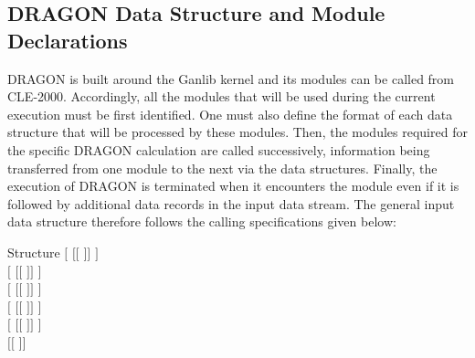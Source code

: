 \subsection{DRAGON Data Structure and Module Declarations}\label{sect:StrucMod}

DRAGON is built around the Ganlib kernel and its modules can be called from CLE-2000.\cite{ganlib5,cle2000}
Accordingly, all the modules that will be used during the current execution must
be first identified. One must also define the format of each data structure that
will be processed by these modules. Then, the modules required for the specific
DRAGON calculation are called successively, information being
transferred from one module to the next via the data structures. Finally,
the execution of DRAGON is terminated when it encounters the  module
even if it is followed by additional data records in the input data stream. The
general input data structure therefore follows the calling specifications given
below:

\begin{DataStructure}{Structure }
$[$  $[[$  $]]$ \moc{;} $]$ \\
$[$  $[[$  $]]$ \moc{;} $]$ \\
$[$  $[[$  $]]$ \moc{;} $]$ \\
$[$  $[[$  $]]$ \moc{;} $]$ \\
$[$  $[[$  $]]$ \moc{;} $]$ \\
$[[$   \moc{;} $]]$ \\
 \moc{;}
\end{DataStructure}

